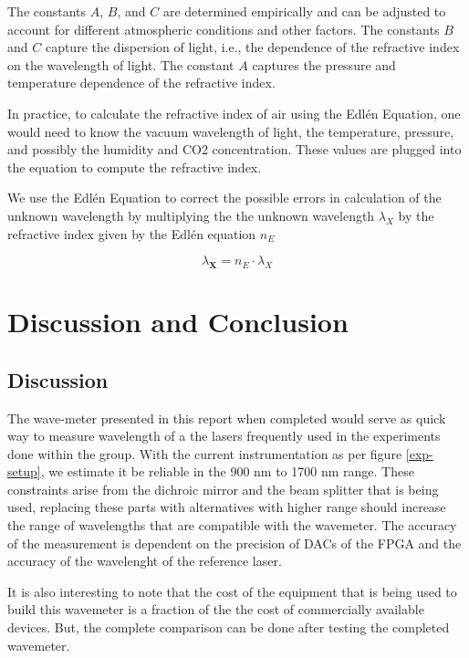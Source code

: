 \documentclass[12pt, twoside]{report}
\begin{document}
The constants $A$, $B$, and $C$ are determined empirically and can be adjusted to account for different atmospheric conditions and other factors. The constants $B$ and $C$ capture the dispersion of light, i.e., the dependence of the refractive index on the wavelength of light. The constant $A$ captures the pressure and temperature dependence of the refractive index.

\vspace{1em}
In practice, to calculate the refractive index of air using the Edlén Equation, one would need to know the vacuum wavelength of light, the temperature, pressure, and possibly the humidity and CO2 concentration. These values are plugged into the equation to compute the refractive index.

\vspace{1em}
We use the Edlén Equation to correct the possible errors in calculation of the unknown wavelength by multiplying the the unknown wavelength $\lambda_X$ by the refractive index given by the Edlén equation $n_E$

\begin{equation}
    \lambda_{\textbf{X}} = n_E \cdot \lambda_X
\end{equation}

\chapter{Discussion and Conclusion}

\section{Discussion}
The wave-meter presented in this report when completed would serve as quick way to measure wavelength of a the lasers frequently used in the experiments done within the group. With the current instrumentation as per figure \ref{exp-setup}, we estimate it be reliable in the 900 nm to 1700 nm range. These constraints arise from the dichroic mirror and the beam splitter that is being used, replacing these parts with alternatives with higher range should increase the range of wavelengths that are compatible with the wavemeter. The accuracy of the measurement is dependent on the precision of DACs of the FPGA and the accuracy of the wavelenght of the reference laser.

\vspace{1em}
It is also interesting to note that the cost of the equipment that is being used to build this wavemeter is a fraction of the the cost of commercially available devices. But, the complete comparison can be done after testing the completed wavemeter. 
\end{document}
